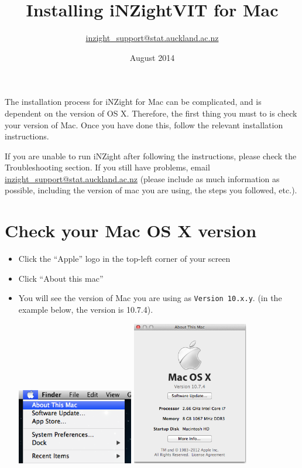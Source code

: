 \documentclass[10pt,a4paper,twoside]{article}
\title{Installing iNZightVIT for Mac}
\author{\url{inzight_support@stat.auckland.ac.nz}}
\date{August 2014}
\begin{document}
\maketitle

The installation process for iNZight for Mac can be complicated, and is dependent on the
version of OS X. Therefore, the first thing you must to is check your version of Mac. Once
you have done this, follow the relevant installation instructions.

If you are unable to run iNZight after following the instructions, please check the
Troubleshooting section. If you still have problems, email
\href{mailto:inzight\_support@stat.auckland.ac.nz}{\url{inzight\_support@stat.auckland.ac.nz}}
(please include as much information as possible, including the version of mac you are
using, the steps you followed, etc.).

\section{Check your Mac OS X version}

\begin{itemize}
\item Click the ``Apple'' logo in the top-left corner of your screen

\item Click ``About this mac''

\item You will see the version of Mac you are using as \verb+Version 10.x.y+. (in the
  example below, the version is 10.7.4).
  \begin{center}
    \includegraphics[width=0.4\textwidth]{fig/mac-aboutmymac1.png} \hspace{1em}
    \includegraphics[width=0.4\textwidth,trim=0cm 6cm 0cm 1.5cm,clip=TRUE]{fig/mac-aboutmymac2.png}
  \end{center}

\end{itemize}
\end{document}
